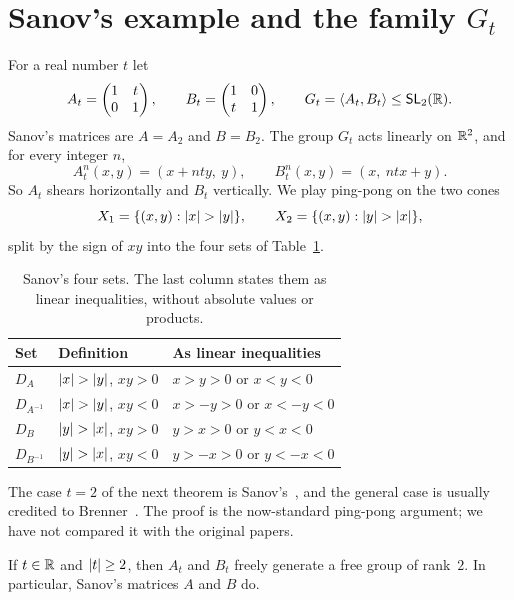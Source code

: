 \section{Sanov's example and the family \texorpdfstring{$G_t$}{G\_t}}\label{sec:sanov}

For a real number $t$ let
\[
  A_t = \begin{pmatrix} 1 & t \\ 0 & 1\end{pmatrix}, \qquad B_t = \begin{pmatrix} 1 & 0 \\ t & 1\end{pmatrix}, \qquad
  G_t = \langle A_t, B_t \rangle \le \mathsf{SL}_2(\mathbb{R}).
\]
Sanov's matrices are $A = A_2$ and $B = B_2$. The group $G_t$ acts linearly on
$\mathbb{R}^2$, and for every integer $n$,
\[
  A_t^n(x,y) = (x + nty,\ y), \qquad B_t^n(x,y) = (x,\ ntx + y).
\]
So $A_t$ shears horizontally and $B_t$ vertically. We play ping-pong on the
two cones
\[
  X_1 = \{(x,y) : \left|x\right| > \left|y\right|\}, \qquad X_2 = \{(x,y) : \left|y\right| > \left|x\right|\},
\]
split by the sign of $xy$ into the four sets of Table~\ref{tab:sanov}.

\begin{table}[htbp]
  \centering
  \caption{Sanov's four sets. The last column states them as linear
  inequalities, without absolute values or products.}
  \label{tab:sanov}
  \begin{tabular}{@{}lll@{}}
    \toprule
    Set & Definition & As linear inequalities \\
    \midrule
    $D_A$      & $\left|x\right| > \left|y\right|$, $xy > 0$ & $x > y > 0$ or $x < y < 0$ \\
    $D_{A^{-1}}$ & $\left|x\right| > \left|y\right|$, $xy < 0$ & $x > -y > 0$ or $x < -y < 0$ \\
    $D_B$      & $\left|y\right| > \left|x\right|$, $xy > 0$ & $y > x > 0$ or $y < x < 0$ \\
    $D_{B^{-1}}$ & $\left|y\right| > \left|x\right|$, $xy < 0$ & $y > -x > 0$ or $y < -x < 0$ \\
    \bottomrule
  \end{tabular}
\end{table}

The case $t = 2$ of the next theorem is Sanov's~\cite{sanov-1947}, and the
general case is usually credited to Brenner~\cite{brenner-1955}. The proof is
the now-standard ping-pong argument; we have not compared it with the original
papers.

\begin{theorem}\label{thm:sanov}
If $t \in \mathbb{R}$ and $\left|t\right| \ge 2$, then $A_t$ and $B_t$ freely generate a free
group of rank~$2$. In particular, Sanov's matrices $A$ and $B$ do.
\end{theorem}

